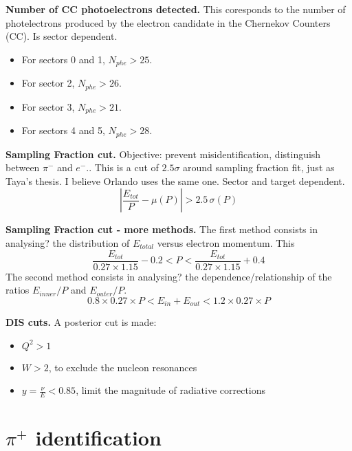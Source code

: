 \textbf{Number of CC photoelectrons detected.} This coresponds to the number of photelectrons produced by the electron candidate in the Chernekov Counters (CC). Is sector dependent.
\begin{itemize}
\item For sectors 0 and 1, $N_{phe} > 25$.
\item For sector 2, $N_{phe} > 26$.
\item For sector 3, $N_{phe} > 21$.
\item For sectors 4 and 5, $N_{phe} > 28$.
\end{itemize}

\textbf{Sampling Fraction cut.} Objective: prevent misidentification, distinguish between $\pi^-$ and $e^-$.. This is a cut of $2.5 \sigma$ around sampling fraction fit, just as Taya's thesis. I believe Orlando uses the same one. Sector and target dependent.
\begin{equation}
  \left| \frac{E_{tot}}{P} - \mu(P) \right| > 2.5 \, \sigma(P)
\end{equation}

\textbf{Sampling Fraction cut - more methods.} The first method consists in analysing? the distribution of $E_{total}$ versus electron momentum. This 
\begin{equation}
  \frac{E_{tot}}{0.27 \times 1.15} - 0.2 < P < \frac{E_{tot}}{0.27 \times 1.15} + 0.4
\end{equation}
The second method consists in analysing? the dependence/relationship of the ratios $E_{inner}/P$ and $E_{outer}/P$.
\begin{equation}
  0.8 \times 0.27 \times P < E_{in} + E_{out} < 1.2 \times 0.27 \times P
\end{equation}

\textbf{DIS cuts.} A posterior cut is made:
\begin{itemize}
\item $Q^2 > 1$
\item $W > 2$, to exclude the nucleon resonances
\item $y = \frac{\nu}{E} < 0.85$, limit the magnitude of radiative corrections
\end{itemize}
%  
\section{$\pi^{+}$ identification}

